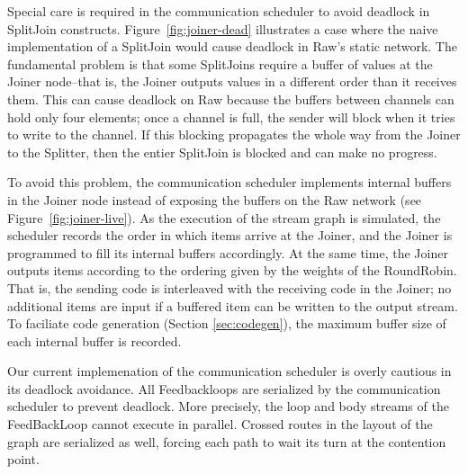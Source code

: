 Special care is required in the communication scheduler to avoid
deadlock in SplitJoin constructs.  Figure~\ref{fig:joiner-dead}
illustrates a case where the naive implementation of a SplitJoin would
cause deadlock in Raw's static network.  The fundamental problem is
that some SplitJoins require a buffer of values at the Joiner
node--that is, the Joiner outputs values in a different order than it
receives them.  This can cause deadlock on Raw because the buffers
between channels can hold only four elements; once a channel is full,
the sender will block when it tries to write to the channel.  If this
blocking propagates the whole way from the Joiner to the Splitter,
then the entier SplitJoin is blocked and can make no progress.

To avoid this problem, the communication scheduler implements internal
buffers in the Joiner node instead of exposing the buffers on the Raw
network (see Figure~\ref{fig:joiner-live}).  As the execution of the
stream graph is simulated, the scheduler records the order in which
items arrive at the Joiner, and the Joiner is programmed to fill its
internal buffers accordingly.  At the same time, the Joiner outputs
items according to the ordering given by the weights of the
RoundRobin.  That is, the sending code is interleaved with the
receiving code in the Joiner; no additional items are input if a
buffered item can be written to the output stream.  To faciliate code
generation (Section \ref{sec:codegen}), the maximum buffer size of
each internal buffer is recorded.

Our current implemenation of the communication scheduler is overly
cautious in its deadlock avoidance.  All Feedbackloops are serialized
by the communication scheduler to prevent deadlock.  More precisely,
the loop and body streams of the FeedBackLoop cannot execute in
parallel.  Crossed routes in the layout of the graph are serialized as
well, forcing each path to wait its turn at the contention point.
